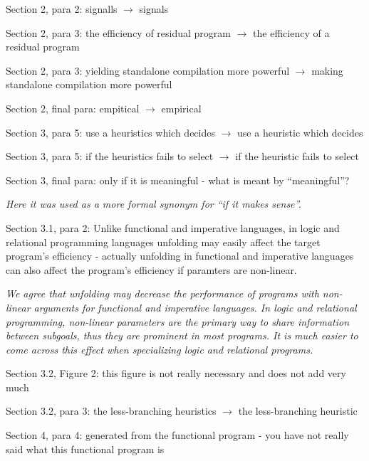 Section 2, para 2: signalls $\to$ signals

Section 2, para 3: the efficiency of residual program $\to$ the efficiency of a residual program

Section 2, para 3: yielding standalone compilation more powerful $\to$ making standalone compilation more powerful

Section 2, final para: empitical $\to$ empirical

Section 3, para 5: use a heuristics which decides $\to$  use a heuristic which decides

Section 3, para 5: if the heuristics fails to select $\to$ if the heuristic fails to select



Section 3, final para: only if it is meaningful - what is meant by ``meaningful''?

\emph{Here it was used as a more formal synonym for ``if it makes sense''.}

Section 3.1, para 2: Unlike functional and imperative languages, in logic and relational programming languages unfolding
may easily affect the target program’s efficiency - actually unfolding in functional and imperative languages can also
affect the program's efficiency if paramters are non-linear.

\emph{We agree that unfolding may decrease the performance of programs with non-linear arguments for functional and imperative languages. In logic and relational programming, non-linear parameters are the primary way to share information between subgoals, thus they are prominent in most programs. It is much easier to come across this effect when specializing logic and relational programs. }


Section 3.2, Figure 2: this figure is not really necessary and does not add very much

Section 3.2, para 3: the less-branching heuristics $\to$ the less-branching heuristic

Section 4, para 4: generated from the functional program - you have not really said what this functional program is

